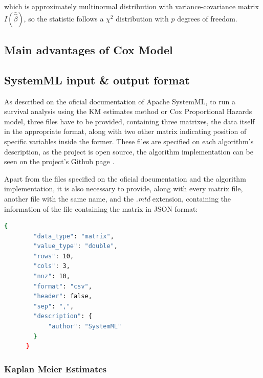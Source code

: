 \documentclass[11pt]{book} %
\begin{document}
        which is approximately multinormal distribution with variance-covariance matrix $I(\bar{\hat{\beta}})$, so the statistic follows a $\chi^2$ distribution with $p$ degrees of freedom.




    \subsection{Main advantages of Cox Model}











  \subsection{SystemML input \& output format}

    As described on the oficial documentation of Apache SystemML, to run a survival analysis using the KM estimates method or Cox Proportional Hazards model, three files have to be provided, containing three matrixes, the data itself in the appropriate format, along with two other matrix indicating position of specific variables inside the former. These files are specified on each algorithm's description, as the project is open source, the algorithm implementation can be seen on the project's Github page \cite{systemml_github_page}.

    Apart from the files specified on the oficial documentation and the algorithm implementation, it is also necessary to provide, along with every matrix file, another file with the same name, and the \emph{.mtd} extension, containing the information of the file containing the matrix in JSON format:

    \begin{lstlisting}[label=matrix_metadata_file, language=sh, caption=Example of matrix metadata file in JSON format]
      {
        "data_type": "matrix",
        "value_type": "double",
        "rows": 10,
        "cols": 3,
        "nnz": 10,
        "format": "csv",
        "header": false,
        "sep": ",",
        "description": {
            "author": "SystemML"
        }
      }
    \end{lstlisting}

\newpage

    \subsubsection{Kaplan Meier Estimates}
\end{document}
